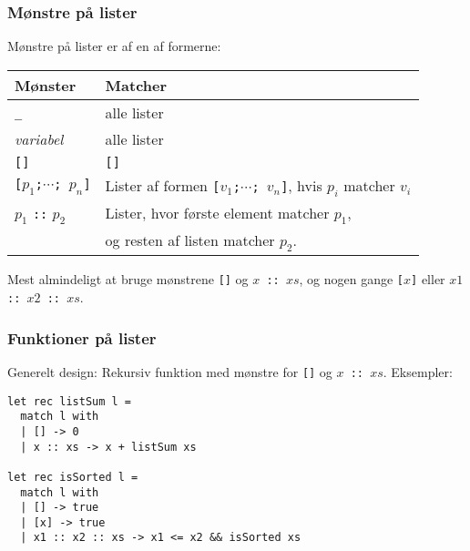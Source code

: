 \documentclass{beamer}
\begin{document}
\begin{frame}[fragile=singleslide]
\frametitle{Mønstre på lister}

Mønstre på lister er af en af formerne:

\vspace{1ex}

\begin{tabular}{l@{\quad}l}
Mønster & Matcher\\\hline
\verb|_| & alle lister \\
\emph{variabel} & alle lister \\
\texttt{[]} & \texttt{[]} \\
\texttt{[$p_1$;$\cdots$;\,$p_n$]} & Lister af formen
\texttt{[$v_1$;$\cdots$;\,$v_n$]}, hvis $p_i$ matcher $v_i$ \\
$p_1$ \texttt{::} $p_2$ & Lister, hvor første element matcher $p_1$,\\
& og resten af listen matcher $p_2$.
\end{tabular}

\vspace{1ex}

Mest almindeligt at bruge mønstrene \texttt{[]} og \texttt{$x$ :: $xs$},
og nogen gange \texttt{[$x$]} eller  \texttt{$x1$ :: $x2$ :: $xs$}.

\end{frame}

\begin{frame}[fragile=singleslide]
\frametitle{Funktioner på lister}

Generelt design: Rekursiv funktion med mønstre for \texttt{[]} og
\texttt{$x$ :: $xs$}.  Eksempler:

\begin{verbatim}
let rec listSum l =
  match l with
  | [] -> 0
  | x :: xs -> x + listSum xs

let rec isSorted l =
  match l with
  | [] -> true
  | [x] -> true
  | x1 :: x2 :: xs -> x1 <= x2 && isSorted xs
\end{verbatim}

\end{frame}
\end{document}
